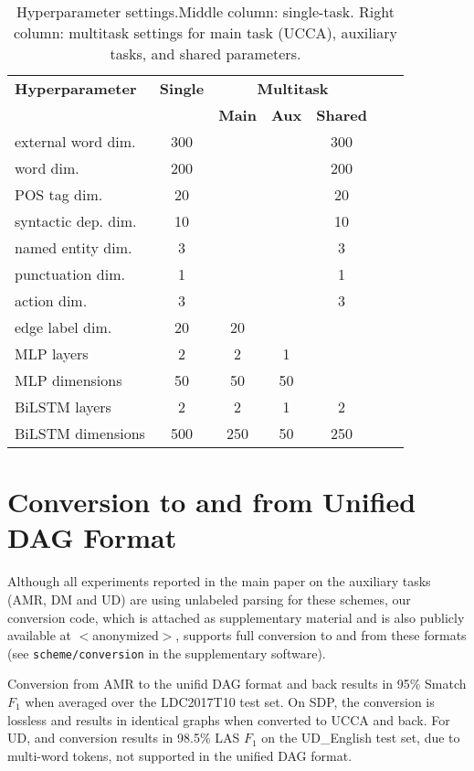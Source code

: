 \documentclass[11pt,a4paper]{article}
\begin{document}
\begin{table}[h]
\centering
\footnotesize
\begin{tabular}{l|c|ccccc}
\bf Hyperparameter &  \bf Single & \multicolumn{3}{c}{\bf Multitask} \\ 
&& \bf Main & \bf Aux & \bf Shared \\
\hline
external word dim. & 300 &&& 300 \\
word dim. & 200 &&& 200 \\
POS tag dim. & 20 &&& 20 \\
syntactic dep. dim. & 10 &&& 10 \\
named entity dim. & 3 &&& 3 \\
punctuation dim. & 1 &&& 1 \\
action dim. & 3 &&& 3 \\
edge label dim. & 20 & 20 \\
MLP layers & 2 & 2 & 1 \\
MLP dimensions & 50 & 50 & 50 \\
BiLSTM layers & 2 & 2 & 1 & 2 \\
BiLSTM dimensions & 500 & 250 & 50 & 250
\end{tabular}
\caption{Hyperparameter settings.\label{tab:hyperparams}
Middle column: single-task.
Right column: multitask settings for main task (UCCA), auxiliary tasks, and shared parameters.}
\end{table}

\section{Conversion to and from Unified DAG Format}\label{sec:convert}

Although all experiments reported in the main paper on the auxiliary tasks
(AMR, DM and UD) are using unlabeled parsing for these schemes,
our conversion code,
which is attached as supplementary material and is also publicly available at $<$anonymized$>$,
supports full conversion to and from these formats
(see \texttt{scheme/conversion} in the supplementary software).

Conversion from AMR to the unifid DAG format and back
results in 95\% Smatch $F_1$ \cite{cai2013smatch} when averaged over the
LDC2017T10 test set.
On SDP, the conversion is lossless and results in identical graphs
when converted to UCCA and back.
For UD, and conversion results in 98.5\% LAS $F_1$ on the UD{\_}English test set,
due to multi-word tokens, not supported in the unified DAG format.
\end{document}
